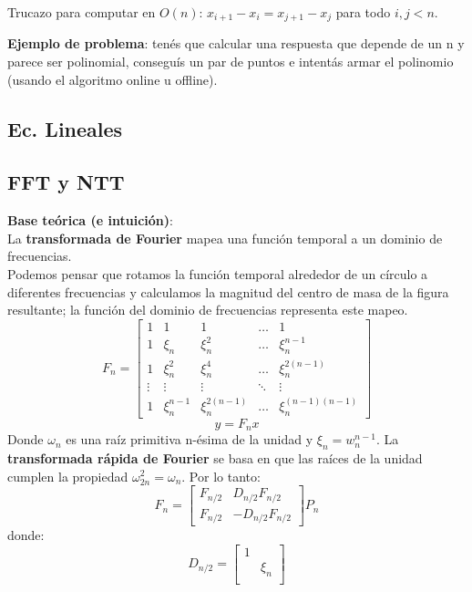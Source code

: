 {Trucazo para computar en \(O(n)\): \(x_{i + 1} - x_i = x_{j + 1} - x_j\) para todo \(i, j < n\).

\textbf{Ejemplo de problema}: tenés que calcular una respuesta que depende de un n y parece ser polinomial, conseguís un par de puntos e 
intentás armar el polinomio (usando el algoritmo online u offline).

\subsection{Ec. Lineales}

\subsection{FFT y NTT}
\textbf{Base teórica (e intuición)}: \\
La \textbf{transformada de Fourier} mapea una función temporal a un dominio de frecuencias. \\
Podemos pensar que rotamos la función temporal alrededor de un círculo a diferentes frecuencias y
calculamos la magnitud del centro de masa de la figura resultante; la función del dominio de 
frecuencias representa este mapeo. \\
\[
    F_n = 
    \begin{bmatrix}
        1 & 1 & 1 & \ldots & 1 \\
        1 & \xi_n & \xi_n^2 & \dots & \xi_n^{n-1} \\
        1 & \xi_n^2 & \xi_n^4 & \dots & \xi_n^{2(n-1)} \\
        \vdots & \vdots & \vdots & \ddots & \vdots \\
        1 & \xi_n^{n-1} & \xi_n^{2(n-1)} & \dots & \xi_n^{(n-1)(n-1)}
    \end{bmatrix}
\]
\[
    y = F_nx
\]
Donde $\omega_n$ es una raíz primitiva n-ésima de la unidad y $\xi_n = w_n^{n-1}$.
La \textbf{transformada rápida de Fourier} se basa en que las raíces de la unidad cumplen la propiedad $ \omega_{2n}^{2} = \omega_{n} $. Por lo tanto:
\[
    F_n = 
    \begin{bmatrix}
        F_{n/2} & D_{n/2}F_{n/2} \\
        F_{n/2} & -D_{n/2}F_{n/2}
    \end{bmatrix}
    P_n 
\]
donde: 
\[
    D_{n/2} = 
    \begin{bmatrix}
        1 \\
        & \xi_n \\

\end{bmatrix}\]}
